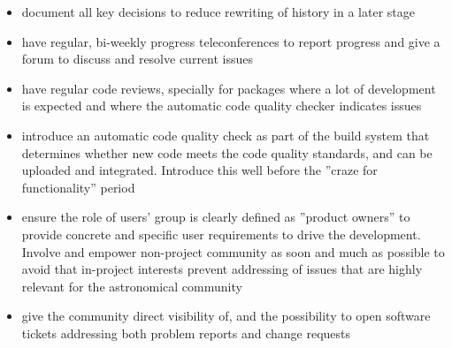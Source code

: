 \begin{itemize}\addtolength{\itemsep}{-0.5\baselineskip}
\item document all key decisions to reduce rewriting of history in a later stage
\item have regular, bi-weekly progress teleconferences to report progress and give a forum to discuss and resolve current issues
\item have regular code reviews, specially for packages where a lot of development is expected and where the automatic code quality checker indicates issues
\item introduce an automatic code quality check as part of the build system that determines whether new code meets the code quality standards, and can be uploaded and integrated. Introduce this well before the ''craze for functionality'' period
\item ensure the role of users' group is clearly defined as ''product owners'' to provide concrete and specific user requirements to drive the development. Involve and empower non-project community as soon and much as possible to avoid that in-project interests prevent addressing of issues that are highly relevant for the astronomical community
\item give the community direct visibility of, and the possibility to open software tickets addressing both problem reports and change requests
\end {itemize}

